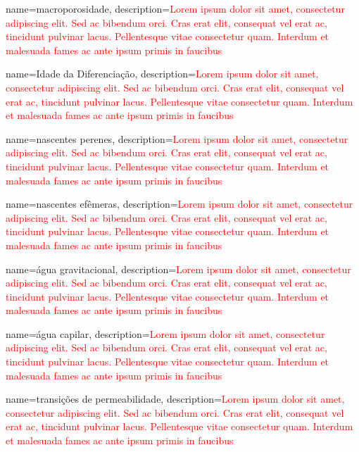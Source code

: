 {
    name=macroporosidade,
    description={\textcolor{red}{Lorem ipsum dolor sit amet, consectetur adipiscing elit. Sed ac bibendum orci. Cras erat elit, consequat vel erat ac, tincidunt pulvinar lacus. Pellentesque vitae consectetur quam. Interdum et malesuada fames ac ante ipsum primis in faucibus}}
}

{
    name=Idade da Diferenciação,
    description={\textcolor{red}{Lorem ipsum dolor sit amet, consectetur adipiscing elit. Sed ac bibendum orci. Cras erat elit, consequat vel erat ac, tincidunt pulvinar lacus. Pellentesque vitae consectetur quam. Interdum et malesuada fames ac ante ipsum primis in faucibus}}
}

{
    name=nascentes perenes,
    description={\textcolor{red}{Lorem ipsum dolor sit amet, consectetur adipiscing elit. Sed ac bibendum orci. Cras erat elit, consequat vel erat ac, tincidunt pulvinar lacus. Pellentesque vitae consectetur quam. Interdum et malesuada fames ac ante ipsum primis in faucibus}}
}

{
    name=nascentes efêmeras,
    description={\textcolor{red}{Lorem ipsum dolor sit amet, consectetur adipiscing elit. Sed ac bibendum orci. Cras erat elit, consequat vel erat ac, tincidunt pulvinar lacus. Pellentesque vitae consectetur quam. Interdum et malesuada fames ac ante ipsum primis in faucibus}}
}

{
    name=água gravitacional,
    description={\textcolor{red}{Lorem ipsum dolor sit amet, consectetur adipiscing elit. Sed ac bibendum orci. Cras erat elit, consequat vel erat ac, tincidunt pulvinar lacus. Pellentesque vitae consectetur quam. Interdum et malesuada fames ac ante ipsum primis in faucibus}}
}

{
    name=água capilar,
    description={\textcolor{red}{Lorem ipsum dolor sit amet, consectetur adipiscing elit. Sed ac bibendum orci. Cras erat elit, consequat vel erat ac, tincidunt pulvinar lacus. Pellentesque vitae consectetur quam. Interdum et malesuada fames ac ante ipsum primis in faucibus}}
}

{
    name=transições de permeabilidade,
    description={\textcolor{red}{Lorem ipsum dolor sit amet, consectetur adipiscing elit. Sed ac bibendum orci. Cras erat elit, consequat vel erat ac, tincidunt pulvinar lacus. Pellentesque vitae consectetur quam. Interdum et malesuada fames ac ante ipsum primis in faucibus}}
}


